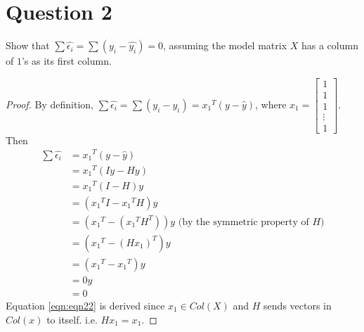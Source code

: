 \section{Question 2}

\begin{question}
    Show that $\sum{\hat{\epsilon_{i}}} = \sum{(y_i - \hat{y_i})} = 0$, assuming the model matrix $X$ has a column of $1$’s
as its first column.
\end{question}

\begin{answer}
    \begin{proof}
        By definition, $\sum{\hat{\epsilon_{i}}} = \sum{(y_i - \hat{y_i})} = {x_1}^T(y - \hat{y})$, where $x_1 = \left[\begin{smallmatrix}1 \\1\\1\\ \vdots\\1\end{smallmatrix}\right]$. Then
        \begin{align}
            \sum{\hat{\epsilon_{i}}} &= {x_1}^T(y - \hat{y})\\
            &= {x_1}^T(Iy - Hy)\\
            &= {x_1}^T(I-H)y\\
            &= ({x_1}^TI - {x_1}^TH)y\\
            &= ({x_1}^T - ({x_1}^TH^T))y \text{ (by the symmetric property of } H \text{)}\\
            &= ({x_1}^T - {(Hx_1)}^T)y\\
            &= ({x_1}^T - {x_1}^T)y \label{eqn:eqn22}\\
            &= 0y\\
            &= 0
        \end{align}
        Equation \ref{eqn:eqn22} is derived since $x_1 \in Col(X)$ and $H$ sends vectors in $Col(x)$ to itself. i.e. $Hx_1 = x_1$.
    \end{proof}
\end{answer}